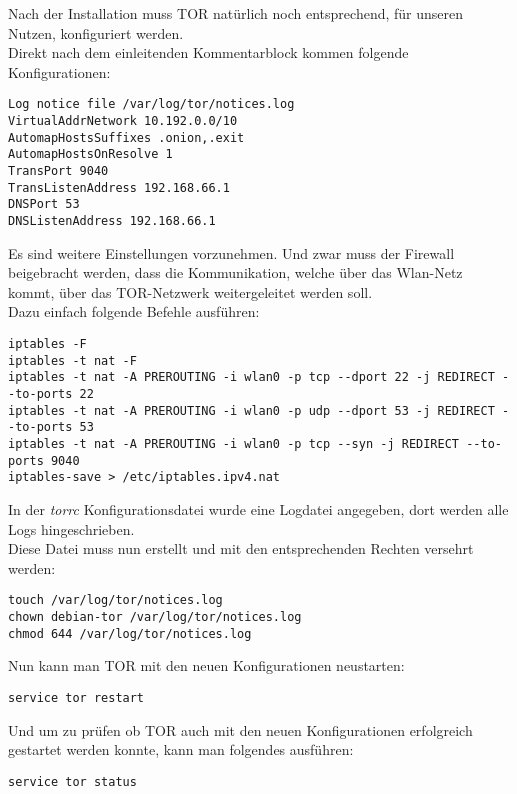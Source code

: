 Nach der Installation muss TOR natürlich noch entsprechend, für unseren Nutzen, konfiguriert werden. \\
Direkt nach dem einleitenden Kommentarblock kommen folgende Konfigurationen:

\begin{lstlisting}
Log notice file /var/log/tor/notices.log
VirtualAddrNetwork 10.192.0.0/10
AutomapHostsSuffixes .onion,.exit
AutomapHostsOnResolve 1
TransPort 9040
TransListenAddress 192.168.66.1
DNSPort 53
DNSListenAddress 192.168.66.1
\end{lstlisting}

Es sind weitere Einstellungen vorzunehmen. Und zwar muss der Firewall beigebracht werden, dass die Kommunikation, welche über das Wlan-Netz kommt, über das TOR-Netzwerk weitergeleitet werden soll. \\
Dazu einfach folgende Befehle ausführen:


\begin{lstlisting}
iptables -F
iptables -t nat -F
iptables -t nat -A PREROUTING -i wlan0 -p tcp --dport 22 -j REDIRECT --to-ports 22
iptables -t nat -A PREROUTING -i wlan0 -p udp --dport 53 -j REDIRECT --to-ports 53
iptables -t nat -A PREROUTING -i wlan0 -p tcp --syn -j REDIRECT --to-ports 9040
iptables-save > /etc/iptables.ipv4.nat
\end{lstlisting}

In der \textit{torrc} Konfigurationsdatei wurde eine Logdatei angegeben, dort werden alle Logs hingeschrieben. \\
Diese Datei muss nun erstellt und mit den entsprechenden Rechten versehrt werden:

\begin{lstlisting}
touch /var/log/tor/notices.log
chown debian-tor /var/log/tor/notices.log
chmod 644 /var/log/tor/notices.log
\end{lstlisting}

Nun kann man TOR mit den neuen Konfigurationen neustarten:

\begin{lstlisting}
service tor restart
\end{lstlisting}

Und um zu prüfen ob TOR auch mit den neuen Konfigurationen erfolgreich gestartet werden konnte, kann man folgendes ausführen:

\begin{lstlisting}
service tor status
\end{lstlisting}

